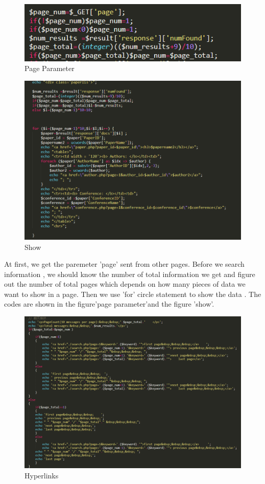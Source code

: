 \documentclass{book}
\begin{document}
\begin{figure}[H]
\centering
\includegraphics[scale=0.5]{img/dsw_get.png}
\caption{Page Parameter}
\end{figure}

\begin{figure}[H]
\centering
\includegraphics[scale=0.35]{img/dsw_show.png}
\caption{Show}
\end{figure}


At first, we get the paremeter 'page' sent from other pages. Before we search information , we should know the number of total information we get and figure out the number of total pages which depends on how many pieces of data we want to show in a page. Then we use 'for' circle statement to show the data . The codes are shown in the figure'page parameter'and the figure 'show'.



\begin{figure}[H]
\centering
\includegraphics[scale=0.3]{img/dsw_chao.png}
\caption{Hyperlinks}
\end{figure}
\end{document}
